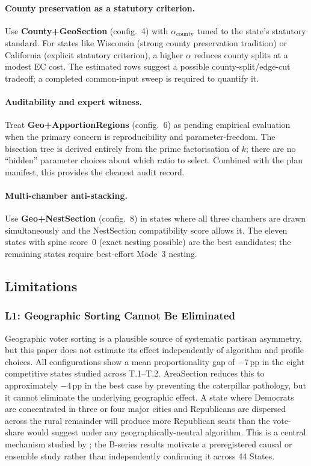 \paragraph{County preservation as a statutory criterion.}
Use \textbf{County+GeoSection} (config.~4) with $\alpha_\text{county}$ tuned to
the state's statutory standard.
For states like Wisconsin (strong county preservation tradition) or California
(explicit statutory criterion), a higher $\alpha$ reduces county splits at a
modest EC cost.
The estimated rows suggest a possible county-split/edge-cut tradeoff; a
completed common-input sweep is required to quantify it.

\paragraph{Auditability and expert witness.}
Treat \textbf{Geo+ApportionRegions} (config.~6) as pending empirical evaluation
when the primary concern is reproducibility and parameter-freedom.
The bisection tree is derived entirely from the prime factorisation of $k$;
there are no ``hidden'' parameter choices about which ratio to select.
Combined with the plan manifest, this provides the cleanest audit record.

\paragraph{Multi-chamber anti-stacking.}
Use \textbf{Geo+NestSection} (config.~8) in states where all three chambers
are drawn simultaneously and the NestSection compatibility score allows it.
The eleven states with spine score~0 (exact nesting possible) are the best
candidates; the remaining states require best-effort Mode~3 nesting.

\subsection{Limitations}

\subsubsection*{L1: Geographic Sorting Cannot Be Eliminated}

Geographic voter sorting is a plausible source of systematic partisan
asymmetry, but this paper does not estimate its effect independently of
algorithm and profile choices.
All configurations show a mean proportionality gap of $-7$\,pp in the eight
competitive states studied across T.1--T.2.
AreaSection reduces this to approximately $-4$\,pp in the best case by preventing
the caterpillar pathology, but it cannot eliminate the underlying geographic
effect.
A state where Democrats are concentrated in three or four major cities and
Republicans are dispersed across the rural remainder will produce more Republican
seats than the vote-share would suggest under any geographically-neutral algorithm.
This is a central mechanism studied by \citet{rodden2019}; the B-series results
motivate a preregistered causal or ensemble study rather than independently
confirming it across 44 States.

